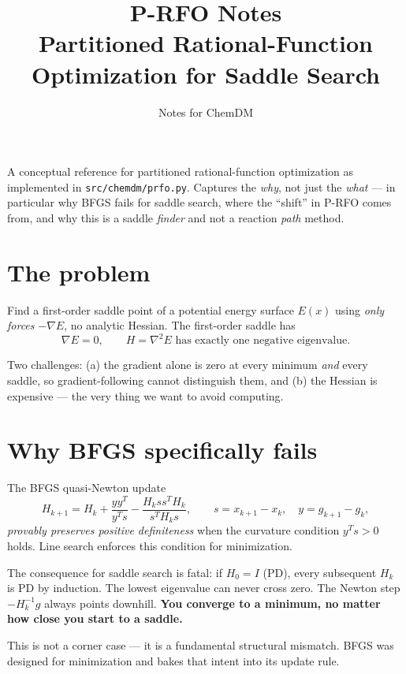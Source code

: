 \documentclass[11pt]{article}
\title{P-RFO Notes\\
       \large Partitioned Rational-Function Optimization for Saddle Search}
\author{Notes for ChemDM}
\date{}
\begin{document}
\maketitle

\noindent A conceptual reference for partitioned rational-function optimization
as implemented in \texttt{src/chemdm/prfo.py}.  Captures the \emph{why}, not
just the \emph{what} --- in particular why BFGS fails for saddle search, where
the ``shift'' in P-RFO comes from, and why this is a saddle \emph{finder} and
not a reaction \emph{path} method.

\section{The problem}

Find a first-order saddle point of a potential energy surface $E(x)$ using
\emph{only forces} $-\nabla E$, no analytic Hessian.  The first-order saddle
has
\begin{equation*}
  \nabla E = 0, \qquad H = \nabla^2 E \text{ has exactly one negative eigenvalue}.
\end{equation*}

Two challenges: (a) the gradient alone is zero at every minimum \emph{and}
every saddle, so gradient-following cannot distinguish them, and (b) the
Hessian is expensive --- the very thing we want to avoid computing.

\section{Why BFGS specifically fails}

The BFGS quasi-Newton update
\begin{equation*}
  H_{k+1} = H_k + \frac{y y^T}{y^T s}
                - \frac{H_k s s^T H_k}{s^T H_k s},
  \qquad s = x_{k+1} - x_k, \quad y = g_{k+1} - g_k,
\end{equation*}
\emph{provably preserves positive definiteness} when the curvature condition
$y^T s > 0$ holds.  Line search enforces this condition for minimization.

The consequence for saddle search is fatal: if $H_0 = I$ (PD), every
subsequent $H_k$ is PD by induction.  The lowest eigenvalue can never cross
zero.  The Newton step $-H_k^{-1} g$ always points downhill.  \textbf{You
converge to a minimum, no matter how close you start to a saddle.}

This is not a corner case --- it is a fundamental structural mismatch.  BFGS
was designed for minimization and bakes that intent into its update rule.
\end{document}

